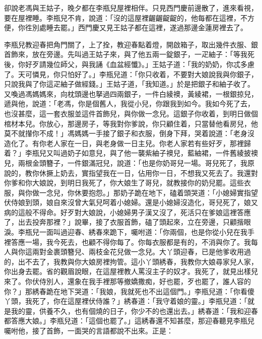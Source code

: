 卻說老馮與王姑子，晚夕都在李瓶兒屋裡相伴。只見西門慶前邊散了，進來看視，要在屋裡睡。李瓶兒不肯，說道：「沒的這屋裡齷齷齪齪的，他每都在這裡，不方便，你徃別處睡去罷。」西門慶又見王姑子都在這裡，遂過那邊金蓮房裡去了。

李瓶兒教迎春把角門關了，上了拴，教迎春點着燈，開啟箱子，取出幾件衣服、銀首飾來，放在旁邊。先叫過王姑子來，與了他五兩一錠銀子，一疋紬子：「等我死後，你好歹請幾位師父，與我誦《血盆經懺》。」王姑子道：「我的奶奶，你忒多慮了。天可憐見，你只怕好了。」李瓶兒道：「你只收着，不要對大娘說我與你銀子，只說我與了你這疋紬子做經錢。」王姑子道，「我知道。」於是把銀子和紬子收了。又喚過馮媽媽來，向枕頭邊也拏過四兩銀子，一件白綾襖，黃綾裙，一根銀掠兒，遞與他，說道：「老馮，你是個舊人，我從小兒，你跟我到如今。我如今死了去，也沒甚麼，這一套衣服並這件首飾兒，與你做一念兒。這銀子你收着，到明日做個棺材本兒。你放心，那邊房子，等我對你爹說，你只顧住着，只當替他看房兒，他莫不就攆你不成！」{}{}馮媽媽一手接了銀子和衣服，倒身下拜，哭着說道：「老身沒造化了。有你老人家在一日，與老身做一日主兒。你老人家若有些好歹，那裡歸着？」{}李瓶兒又叫過奶子如意兒，與了他一襲紫紬子襖兒，藍紬裙，一件舊綾披襖兒，兩根金頭簪子，一件銀滿冠兒，說道：「也是你奶哥兒一場。哥兒死了，我原說的，教你休撅上奶去，實指望我在一日，佔用你一日，不想我又死去了。我還對你爹和你大娘說，到明日我死了，你大娘生了哥兒，就教接你的奶兒罷。這些衣服，與你做一念兒，你休要抱怨。」那奶子跪在地下，磕着頭哭道：「小媳婦實指望伏侍娘到頭，娘自來沒曾大氣兒呵着小媳婦。還是小媳婦沒造化，哥兒死了，娘又病的這般不得命。好歹對大娘說，小媳婦男子漢又沒了，死活只在爹娘這裡答應了，出去投奔那裡？」說畢，接了衣服首飾，磕了頭起來，立在旁邊，只顧揩眼淚。{}李瓶兒一面叫過迎春、綉春來跪下，囑咐道：「你兩個，也是你從小兒在我手裡答應一場，我今死去，也顧不得你每了。你每衣服都是有的，不消與你了。我每人與你這兩對金裹頭簪兒、兩枝金花兒做一念兒。大丫頭迎春，已是他爹收用過的，出不去了，我教與你大娘房裡拘管。這小丫頭綉春，我教你大娘尋家兒人家，你出身去罷。省的觀眉說眼，在這屋裡教人罵沒主子的奴才。我死了，就見出樣兒來了。你伏侍別人，還象在我手裡那等撤嬌撒痴，好也罷，歹也罷了，誰人容的你？」那綉春跪在地下哭道：「我娘，我就死也不出這個門。」李瓶兒道：「你看傻丫頭，我死了，你在這屋裡伏侍誰？」綉春道：「我守着娘的靈。」李瓶兒道：「就是我的靈，供養不久，也有個燒的日子，你少不的也還出去。」綉春道：「我和迎春都答應大娘。」李瓶兒道：「這個也罷了。」這綉春還不知甚麼，那迎春聽見李瓶兒囑咐他，接了首飾，一面哭的言語都說不出來。{}正是：

